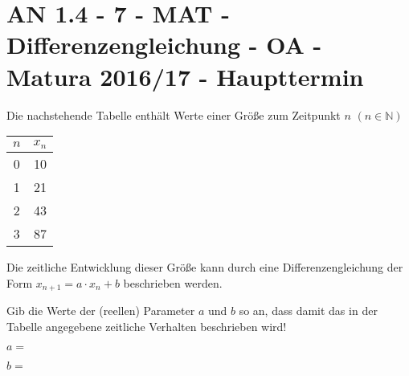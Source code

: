 \section{AN 1.4 - 7 - MAT - Differenzengleichung - OA - Matura 2016/17 - Haupttermin}

\begin{beispiel}[AN 1.4]{1} %
Die nachstehende Tabelle enthält Werte einer Größe zum Zeitpunkt $n$ $(n \in \mathbb{N})$

\begin{center}
\begin{tabular}{|c|c|}\hline
\cellcolor{black!20} $n$ & \cellcolor{black!20} $x_n$ \\ \hline
0 & 10 \\ \hline
1 & 21 \\ \hline
2 & 43 \\ \hline
3 & 87 \\ \hline
\end{tabular}
\end{center}

Die zeitliche Entwicklung dieser Größe kann durch eine Differenzengleichung der Form
$x_{n+1} = a \cdot x_n + b$ beschrieben werden. \leer

Gib die Werte der (reellen) Parameter $a$ und $b$ so an, dass damit das in der Tabelle angegebene zeitliche Verhalten beschrieben wird! \leer

$a=$ 

$b=$  


\end{beispiel}